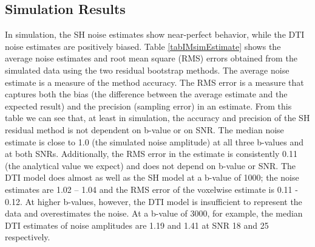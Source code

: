 \subsection{Simulation Results}

In simulation, the SH noise estimates show near-perfect behavior, while
the DTI noise estimates are positively biased. Table \ref{tabIMsimEstimate} shows the average
noise estimates and root mean square (RMS) errors obtained from the
simulated data using the two residual bootstrap methods. The average
noise estimate is a measure of the method accuracy. The RMS error is a
measure that captures both the bias (the difference between the average
estimate and the expected result) and the precision (sampling error) in
an estimate. From this table we can see that, at least in simulation,
the accuracy and precision of the SH residual method is not dependent on
b-value or on SNR. The median noise estimate is close to 1.0 (the
simulated noise amplitude) at all three b-values and at both SNRs.
Additionally, the RMS error in the estimate is consistently 0.11 (the
analytical value we expect) and does not depend on b-value or SNR. The
DTI model does almost as well as the SH model at a b-value of 1000; the
noise estimates are 1.02 -- 1.04 and the RMS error of the voxelwise
estimate is 0.11 - 0.12. At higher b-values, however, the DTI model is
insufficient to represent the data and overestimates the noise. At a
b-value of 3000, for example, the median DTI estimates of noise
amplitudes are 1.19 and 1.41 at SNR 18 and 25 respectively.

